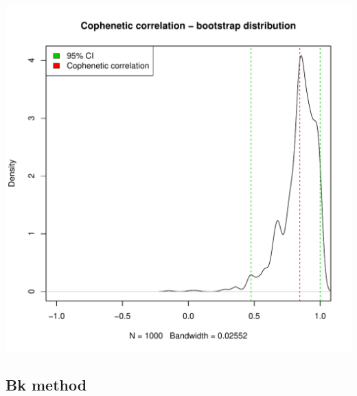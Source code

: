 \documentclass[shortnames,nojss,article]{jss}\usepackage[]{graphicx}\usepackage[]{color}
\makeatletter
\def\maxwidth{ %
  \ifdim\Gin@nat@width>\linewidth
    \linewidth
  \else
    \Gin@nat@width
  \fi
}
\newenvironment{knitrout}{}{} %
\makeatother
\begin{document}
\begin{knitrout}
{\centering \includegraphics[width=\maxwidth]{figure/cor_cophenetic_simulation_CI_4} 

}



\end{knitrout}





\subsection{Bk method}














% 
% 
% 
% 
% 
%   
%   
% 
% 
\end{document}
